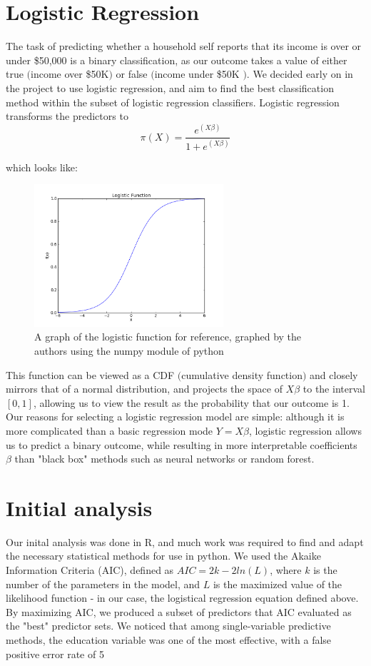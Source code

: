 \documentclass[11pt]{article}
\begin{document}
\section{ Logistic Regression}
The task of predicting whether a household self reports that its income is over or under \$50,000 is a binary classification, as our outcome takes a value of either true $($income over \$50K$)$ or false $($income under \$50K $)$.  We decided early on in the project to use logistic regression, and aim to find the best classification method within the subset of logistic regression classifiers. Logistic regression transforms the predictors to
\begin{equation}
\pi(X) = \frac{e^{(X\beta)}}{1+e^{(X\beta)}}
\end{equation}

which looks like:
\begin{figure}[h!]
\centering
\includegraphics[width = 7cm]{logisticfunction.png}
\caption{A graph of the logistic function for reference, graphed by the authors using the numpy module of python}
\end{figure}


This function can be viewed as a CDF $($cumulative density function$)$ and closely mirrors that of a normal distribution, and projects the space of $X \beta$ to the interval $[0,1]$, allowing us to view the result as the probability that our outcome is 1. Our reasons for selecting a logistic regression model are simple: although it is more complicated than a basic regression mode $Y = X\beta$, logistic regression allows us to predict a binary outcome, while resulting in more interpretable coefficients $\beta$ than "black box" methods such as neural networks or random forest. 

\section{Initial analysis}
Our inital analysis was done in R, and much work was required to find and adapt the necessary statistical methods for use in python. 
We used the Akaike Information Criteria (AIC), defined as $AIC = 2k - 2ln(L)$, where $k$ is the number of the parameters in the model, and $L$ is the maximized value of the likelihood function - in our case, the logistical regression equation defined above. By maximizing AIC, we produced a subset of predictors that AIC evaluated as the "best" predictor sets. We noticed that among single-variable predictive methods, the education variable was one of the most effective, with a false positive error rate of 5%
\end{document}
